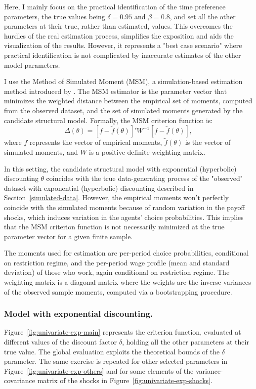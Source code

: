 Here, I mainly focus on the practical identification of the time preference parameters, the true values being $\delta = 0.95$ and $\beta = 0.8$, and set all the other parameters at their true, rather than estimated, values. This overcomes the hurdles of the real estimation process, simplifies the exposition and aids the visualization of the results. However, it represents a "best case scenario" where practical identification is not complicated by inaccurate estimates of the other model parameters. 

I use the Method of Simulated Moment (MSM), a simulation-based estimation method introduced by \textcite{McFadden1989}. The MSM estimator is the parameter vector that minimizes the weighted distance between the empirical set of moments, computed from the observed dataset, and the set of simulated moments generated by the candidate structural model. Formally, the MSM criterion function is:
\begin{equation}
\Delta(\theta) = [f - \tilde{f}(\theta)]'W^{-1}[f - \tilde{f}(\theta)],
\end{equation}
where $f$ represents the vector of empirical moments, $\tilde{f}(\theta)$ is the vector of simulated moments, and $W$ is a positive definite weighting matrix.

In this setting, the candidate structural model with exponential (hyperbolic) discounting $\theta$ coincides with the true data-generating process of the "observed" dataset with exponential (hyperbolic) discounting described in Section~\ref{simulated-data}. However, the empirical moments won't perfectly coincide with the simulated moments because of random variation in the payoff shocks, which induces variation in the agents' choice probabilities. This implies that the MSM criterion function is not necessarily minimized at the true parameter vector for a given finite sample.

The moments used for estimation are per-period choice probabilities, conditional on restriction regime, and the per-period wage profile (mean and standard deviation) of those who work, again conditional on restriction regime. The weighting matrix is a diagonal matrix where the weights are the inverse variances of the observed sample moments, computed via a bootstrapping procedure. 

\subsubsection{Model with exponential discounting.} Figure~\ref{fig:univariate-exp-main} represents the criterion function, evaluated at different values of the discount factor $\delta$, holding all the other parameters at their true value. The global evaluation exploits the theoretical bounds of the $\delta$ parameter. The same exercise is repeated for other selected parameters in Figure~\ref{fig:univariate-exp-others} and for some elements of the variance-covariance matrix of the shocks in Figure~\ref{fig:univariate-exp-shocks}. 


